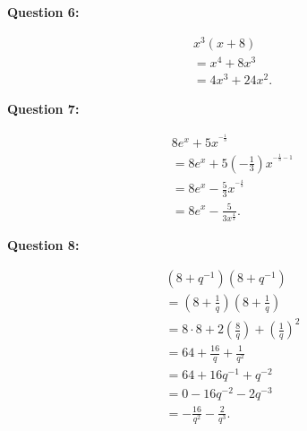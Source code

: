 \documentclass{report}
\begin{document}
    \bigbreak \noindent \bigbreak \noindent 
    \begin{Large}
        \noindent \textbf{Question 6:}
    \end{Large}
    \bigbreak \noindent 
    \bigbreak \noindent 
    \begin{align*}
        x^3(x+8) \\
        = x^4+8x^3 \\ 
        = 4x^3 +24x^2
    .\end{align*}

    \bigbreak \noindent \bigbreak \noindent 
    \begin{Large}
        \noindent \textbf{Question 7:}
    \end{Large}
    \bigbreak \noindent 
    \bigbreak \noindent 
    \begin{align*}
        8e^x + 5x^{ ^{-\frac{1}{3}}} \\
        = 8e^x+5(- \frac{1}{3})x^{ ^{-\frac{1}{3} - 1}} \\ 
        = 8e^x - \frac{5}{3}x^{ ^{-\frac{4}{3}}} \\
        = 8e^x - \frac{5}{3x^{ \frac{4}{3}}}
    .\end{align*}

    \bigbreak \noindent \bigbreak \noindent 
    \begin{Large}
        \noindent \textbf{Question 8:}
    \end{Large}
    \bigbreak \noindent 
    \bigbreak \noindent 
    \begin{align*}
        (8+q^{-1})(8+q^{-1}) \\ 
        =(8+ \frac{1}{q})(8+ \frac{1}{q}) \\
        =8 \cdot 8+2( \frac{8}{q}) + ( \frac{1}{q})^2 \\ 
        = 64+ \frac{16}{q} + \frac{1}{q^2} \\ 
        = 64 +16q^{-1} + q^{-2} \\ 
        = 0 -16q^{-2} -2q^{-3} \\ 
        = - \frac{16}{q^2} - \frac{2}{q^3}
    .\end{align*}
\end{document}
